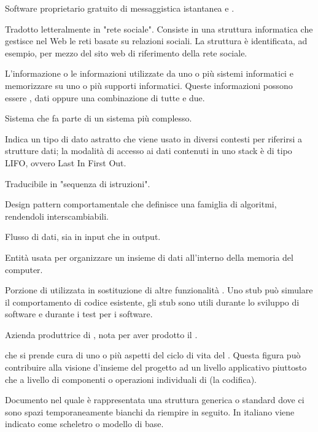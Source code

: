 {Software proprietario gratuito di messaggistica istantanea e .}

{Tradotto letteralmente in "rete sociale". Consiste in una struttura informatica che gestisce nel Web le reti basate su relazioni sociali. La struttura è identificata, ad esempio, per mezzo del sito web di riferimento della rete sociale.}

{L'informazione o le informazioni utilizzate da uno o più sistemi informatici e memorizzare su uno o più supporti informatici. Queste informazioni possono essere , dati oppure una combinazione di tutte e due.}

{Sistema che fa parte di un sistema più complesso.}

{Indica un tipo di dato astratto che viene usato in diversi contesti per riferirsi a strutture dati; la modalità di accesso ai dati contenuti in uno stack è di tipo LIFO, ovvero Last In First Out.}

{Traducibile in "sequenza di istruzioni".}

{Design pattern comportamentale che definisce una famiglia di algoritmi, rendendoli interscambiabili.}

{Flusso di dati, sia in input che in output.}

{Entità usata per organizzare un insieme di dati all'interno della memoria del computer.}

{Porzione di  utilizzata in sostituzione di altre funzionalità . Uno stub può simulare il comportamento di codice esistente, gli stub sono utili durante lo sviluppo di software e durante i test per i software.}

{Azienda produttrice di , nota per aver prodotto il  .}

{ che si prende cura di uno o più aspetti del ciclo di vita del . Questa figura può contribuire alla visione d'insieme del progetto ad un livello applicativo piuttosto che a livello di componenti o operazioni individuali di  (la codifica).}




{Documento nel quale è rappresentata una struttura generica o standard dove ci sono spazi temporaneamente bianchi da riempire in seguito. In italiano viene indicato come scheletro o modello di base.}

